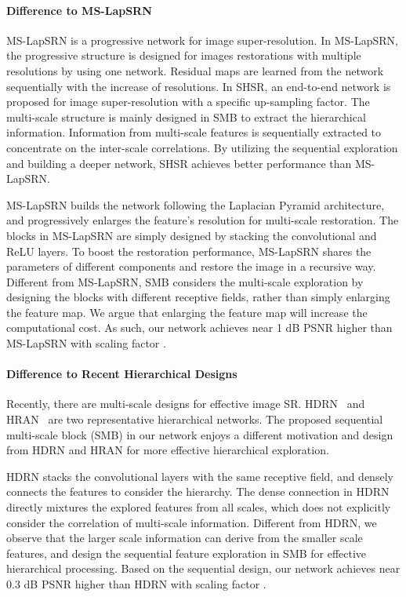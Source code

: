 \documentclass[manuscript,screen]{acmart}
\begin{document}
\paragraph{Difference to MS-LapSRN~\cite{lapsrn_pami2019}}
MS-LapSRN is a progressive network for image super-resolution. In MS-LapSRN, the progressive structure is designed for images restorations with multiple resolutions by using one network. Residual maps are learned from the network sequentially with the increase of resolutions. In SHSR, an end-to-end network is proposed for image super-resolution with a specific up-sampling factor. The multi-scale structure is mainly designed in SMB to extract the hierarchical information. Information from multi-scale features is sequentially extracted to concentrate on the inter-scale correlations. By utilizing the sequential exploration and building a deeper network, SHSR achieves better performance than MS-LapSRN.

MS-LapSRN builds the network following the Laplacian Pyramid architecture, and progressively enlarges the feature’s resolution for multi-scale restoration. The blocks in MS-LapSRN are simply designed by stacking the convolutional and ReLU layers. To boost the restoration performance, MS-LapSRN shares the parameters of different components and restore the image in a recursive way. Different from MS-LapSRN, SMB considers the multi-scale exploration by designing the blocks with different receptive fields, rather than simply enlarging the feature map. We argue that enlarging the feature map will increase the computational cost. As such, our network achieves near 1 dB PSNR higher than MS-LapSRN with scaling factor .


\paragraph{Difference to Recent Hierarchical Designs}
Recently, there are multi-scale designs for effective image SR. HDRN~\cite{hdrn} and HRAN~\cite{hran} are two representative hierarchical networks. The proposed sequential multi-scale block (SMB) in our network enjoys a different motivation and design from HDRN and HRAN for more effective hierarchical exploration.

HDRN stacks the convolutional layers with the same receptive field, and densely connects the features to consider the hierarchy. The dense connection in HDRN directly mixtures the explored features from all scales, which does not explicitly consider the correlation of multi-scale information. Different from HDRN, we observe that the larger scale information can derive from the smaller scale features, and design the sequential feature exploration in SMB for effective hierarchical processing. Based on the sequential design, our network achieves near 0.3 dB PSNR higher than HDRN with scaling factor .
\end{document}
